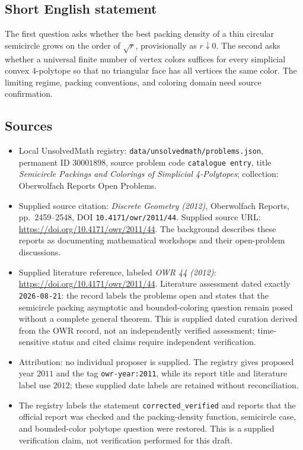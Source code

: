 \documentclass[11pt]{article}
\begin{document}
\subsection{Short English statement}
The first question asks whether the best packing density of a thin circular semicircle grows on the order of \(\sqrt r\), provisionally as \(r\downarrow0\). The second asks whether a universal finite number of vertex colors suffices for every simplicial convex \(4\)-polytope so that no triangular face has all vertices the same color. The limiting regime, packing conventions, and coloring domain need source confirmation.
\subsection{Sources}
\begin{itemize}
\item Local UnsolvedMath registry: \texttt{data/unsolvedmath/problems.json}, permanent ID \(30001898\), source problem code \texttt{catalogue entry}, title \emph{Semicircle Packings and Colorings of Simplicial 4-Polytopes}; collection: Oberwolfach Reports Open Problems.
\item Supplied source citation: \emph{Discrete Geometry (2012)}, Oberwolfach Reports, pp.\ 2459--2548, DOI \texttt{10.4171/owr/2011/44}. Supplied source URL: \url{https://doi.org/10.4171/owr/2011/44}. The background describes these reports as documenting mathematical workshops and their open-problem discussions.
\item Supplied literature reference, labeled \emph{OWR 44 (2012)}: \url{https://doi.org/10.4171/owr/2011/44}. Literature assessment dated exactly \texttt{2026-08-21}: the record labels the problems open and states that the semicircle packing asymptotic and bounded-coloring question remain posed without a complete general theorem. This is supplied dated curation derived from the OWR record, not an independently verified assessment; time-sensitive status and cited claims require independent verification.
\item Attribution: no individual proposer is supplied. The registry gives proposed year \(2011\) and the tag \texttt{owr-year:2011}, while its report title and literature label use \(2012\); these supplied date labels are retained without reconciliation.
\item The registry labels the statement \texttt{corrected\_verified} and reports that the official report was checked and the packing-density function, semicircle case, and bounded-color polytope question were restored. This is a supplied verification claim, not verification performed for this draft.
\end{itemize}
\end{document}
